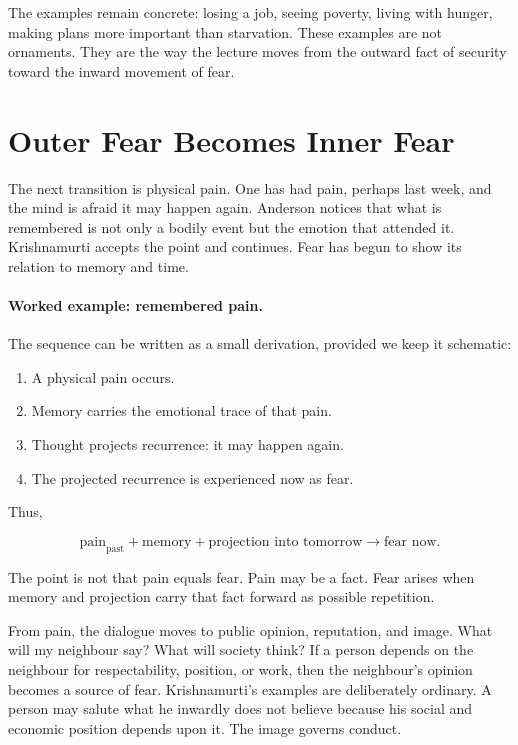 The examples remain concrete: losing a job, seeing poverty, living with hunger, making plans more important than starvation. These examples are not ornaments. They are the way the lecture moves from the outward fact of security toward the inward movement of fear.

\section{Outer Fear Becomes Inner Fear}

The next transition is physical pain. One has had pain, perhaps last week, and the mind is afraid it may happen again. Anderson notices that what is remembered is not only a bodily event but the emotion that attended it. Krishnamurti accepts the point and continues. Fear has begun to show its relation to memory and time.

\paragraph{Worked example: remembered pain.}
The sequence can be written as a small derivation, provided we keep it schematic:

\begin{enumerate}
\item A physical pain occurs.
\item Memory carries the emotional trace of that pain.
\item Thought projects recurrence: it may happen again.
\item The projected recurrence is experienced now as fear.
\end{enumerate}

Thus,

\begin{equation}
\text{pain}_{\mathrm{past}}
+\text{memory}
+\text{projection into tomorrow}
\longrightarrow
\text{fear now}.
\end{equation}

The point is not that pain equals fear. Pain may be a fact. Fear arises when memory and projection carry that fact forward as possible repetition.

From pain, the dialogue moves to public opinion, reputation, and image. What will my neighbour say? What will society think? If a person depends on the neighbour for respectability, position, or work, then the neighbour's opinion becomes a source of fear. Krishnamurti's examples are deliberately ordinary. A person may salute what he inwardly does not believe because his social and economic position depends upon it. The image governs conduct.

